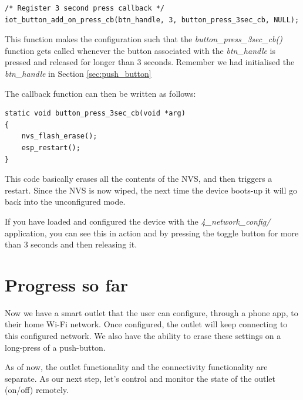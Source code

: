 \documentclass[main.tex]{subfiles}
\begin{document}
\begin{verbatim}
/* Register 3 second press callback */  
iot_button_add_on_press_cb(btn_handle, 3, button_press_3sec_cb, NULL);
\end{verbatim}

This function makes the configuration such that the \textit{button\_press\_3sec\_cb()} function gets called whenever the button associated with the \textit{btn\_handle} is pressed and released for longer than 3 seconds. Remember we had initialised the \textit{btn\_handle} in Section \ref{sec:push_button}

The callback function can then be written as follows:
\begin{verbatim}
static void button_press_3sec_cb(void *arg)
{
    nvs_flash_erase();
    esp_restart();
}
\end{verbatim}

This code basically erases all the contents of the NVS, and then triggers a restart. Since the NVS is now wiped, the next time the device boots-up it will go back into the unconfigured mode. 

If you have loaded and configured the device with the \textit{4\_network\_config/} application, you can see this in action and by pressing the toggle button for more than 3 seconds and then releasing it.

\section{Progress so far}
Now we have a smart outlet that the user can configure, through a phone app, to their home Wi-Fi network. Once configured, the outlet will keep connecting to this configured network. We also have the ability to erase these settings on a long-press of a push-button.

As of now, the outlet functionality and the connectivity functionality are separate. As our next step, let's control and monitor the state of the outlet (on/off) remotely.
\end{document}
